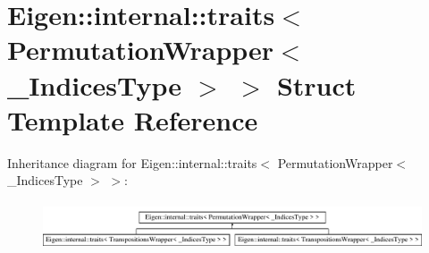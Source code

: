 \hypertarget{struct_eigen_1_1internal_1_1traits_3_01_permutation_wrapper_3_01___indices_type_01_4_01_4}{}\section{Eigen\+:\+:internal\+:\+:traits$<$ Permutation\+Wrapper$<$ \+\_\+\+Indices\+Type $>$ $>$ Struct Template Reference}
\label{struct_eigen_1_1internal_1_1traits_3_01_permutation_wrapper_3_01___indices_type_01_4_01_4}
Inheritance diagram for Eigen\+:\+:internal\+:\+:traits$<$ Permutation\+Wrapper$<$ \+\_\+\+Indices\+Type $>$ $>$\+:\begin{figure}[H]
\begin{center}
\leavevmode
\includegraphics[height=1.450777cm]{struct_eigen_1_1internal_1_1traits_3_01_permutation_wrapper_3_01___indices_type_01_4_01_4}
\end{center}
\end{figure}
